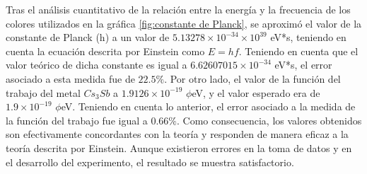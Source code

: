 \documentclass[%
 reprint,
 amsmath,amssymb,
 aps,
]{revtex4-1}
\begin{document}
Tras el análisis cuantitativo de la relación entre la energía y la frecuencia de los colores utilizados en la gráfica \ref{fig:constante de Planck}, se aproximó el valor de la constante de Planck (h) a un valor de $5.13278 \times 10^{-34} \times 10^{39}$ eV*s, teniendo en cuenta la ecuación descrita por Einstein como $E=hf$. Teniendo en cuenta que el valor teórico de dicha constante es igual a $6.62607015 \times 10^{-34}$ eV*s, el error asociado a esta medida fue de $22.5\%$. Por otro lado, el valor de la función del trabajo del metal $Cs_3Sb$ a $1.9126 \times 10^{-19}$ $\phi$eV, y el valor esperado era de $1.9 \times 10^{-19}$ $\phi$eV. Teniendo en cuenta lo anterior, el error asociado a la medida de la función del trabajo fue igual a $0.66\%$. Como consecuencia, los valores obtenidos son efectivamente concordantes con la teoría y responden de manera eficaz a la teoría descrita por Einstein. Aunque existieron errores en la toma de datos y en el desarrollo del experimento, el resultado se muestra satisfactorio.


\end{document}
